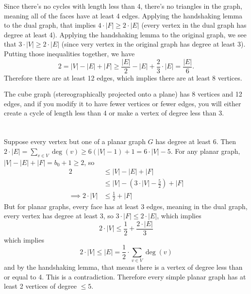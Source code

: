 \documentclass[12pt]{article}
\begin{document}
Since there's no cycles with length less than 4, there's no triangles in the graph, meaning all of the faces have at least 4 edges. Applying the handshaking lemma to the dual graph, that implies $4\cdot |F| \geq 2 \cdot |E|$ (every vertex in the dual graph has degree at least 4). Applying the handshaking lemma to the original graph, we see that $3 \cdot |V| \geq 2 \cdot |E|$ (since very vertex in the original graph has degree at least 3). Putting those inequalities together, we have
\[ 2 = |V| - |E| + |F| \geq \frac{|E|}{2} - |E| + \frac{2}{3} \cdot |E| = \frac{|E|}{6}. \]
Therefore there are at least 12 edges, which implies there are at least 8 vertices.
\par
The cube graph (stereographically projected onto a plane) has 8 vertices and 12 edges, and if you modify it to have fewer vertices or fewer edges, you will either create a cycle of length less than 4 or make a vertex of degree less than 3.

\section{}
\noindent{}\bigskip\par
Suppose every vertex but one of a planar graph $G$ has degree at least 6. Then $2 \cdot |E|  = \sum_{v \in V} \operatorname{deg}(v) \geq 6(|V|-1)+1 = 6 \cdot |V| - 5$. For any planar graph, $|V|-|E|+|F|=b_0+1 \geq 2$, so
\begin{align*}
    2 &\leq |V|-|E|+|F| \\
      &\leq |V| - \left( 3 \cdot |V|- \frac{5}{2} \right) + |F| \\
    \implies 2 \cdot |V| &\leq \frac{1}{2} + |F|
\end{align*}
But for planar graphs, every face has at least 3 edges, meaning in the dual graph, every vertex has degree at least 3, so $3 \cdot |F| \leq 2 \cdot |E|$, which implies
\[ 2 \cdot |V| \leq \frac{1}{2} + \frac{2\cdot|E|}{3} \]
which implies
\[ 2 \cdot |V| \leq |E| = \frac{1}{2} \cdot \sum_{v \in V} \operatorname{deg}(v) \]
and by the handshaking lemma, that means there is a vertex of degree less than or equal to 4. This is a contradiction. Therefore every simple planar graph has at least 2 vertices of degree $\leq 5$.
\end{document}
